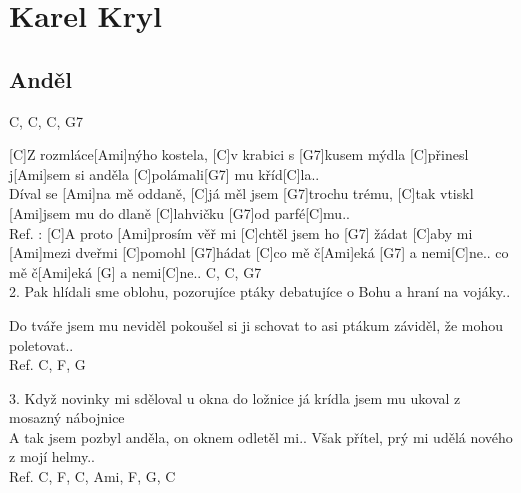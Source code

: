\documentclass[12pt]{article}
\begin{document}
\section{Karel Kryl}

\subsection{Anděl}
\begin{multicols}{2}
	C, C, C, G7
	
	[C]Z rozmláce[Ami]nýho kostela,
	[C]v krabici s [G7]kusem mýdla
	[C]přinesl j[Ami]sem si anděla
	[C]polámali[G7] mu kříd[C]la..
	\\
	[C]Díval se [Ami]na mě oddaně,
	[C]já měl jsem [G7]trochu trému,
	[C]tak vtiskl [Ami]jsem mu do dlaně
	[C]lahvičku [G7]od parfé[C]mu..
	\\
	Ref. : [C]A proto [Ami]prosím věř mi
	[C]chtěl jsem ho [G7] žádat
	[C]aby mi [Ami]mezi dveřmi
	[C]pomohl [G7]hádat
	[C]co mě č[Ami]eká  [G7] a nemi[C]ne..
	co mě č[Ami]eká [G] a nemi[C]ne..
	C, C, G7
	\\
	2. Pak hlídali sme oblohu,
	pozorujíce ptáky
	debatujíce o Bohu
	a hraní na vojáky..
	
	Do tváře jsem mu neviděl
	pokoušel si ji schovat
	to asi ptákum záviděl,
	že mohou poletovat..
	\\
	Ref. 
	C, F, G
	
	3. Když novinky mi sděloval
	u okna do ložnice
	já krídla jsem mu ukoval
	z mosazný nábojnice
	\\
	A tak jsem pozbyl anděla,
	on oknem odletěl mi..
	Však přítel, prý mi udělá
	nového z mojí helmy..
	\\
	Ref. 
	C, F, C, Ami, F, G, C
\end{multicols}
\end{document}
